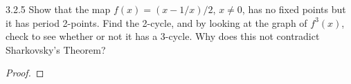 \begin{problem}{3.2.5}
  Show that the map $f(x) = (x - 1/x)/2$, $x \neq 0$, has no fixed points but it has
  period 2-points. Find the 2-cycle, and by looking at the graph of $f^3 (x)$, check to see
  whether or not it has a 3-cycle. Why does this not contradict Sharkovsky’s Theorem?
\end{problem}

\begin{proof}
\end{proof}
\newpage
